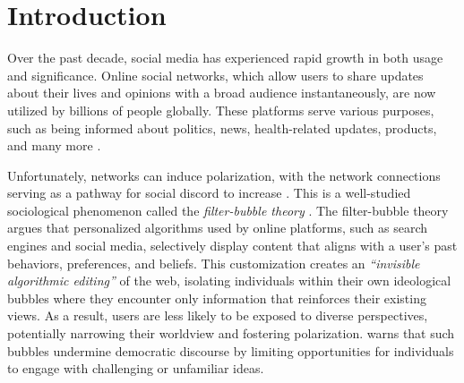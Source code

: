 \section{Introduction}


Over the past decade, social media has experienced rapid growth in both usage and significance. Online social networks, which allow users to share updates about their lives and opinions with a broad audience instantaneously, are now utilized by billions of people globally. These platforms serve various purposes, such as being informed about politics, news, health-related updates, products, and many more \citep{backstrom2012four,young2006diffusion,banerjee2013diffusion,shearer2021news}. 

Unfortunately, networks can induce polarization, with the network connections serving as a pathway for social discord to increase \cite{musco2018minimizing,chen2021adversarial,wang2024relationship,gaitonde2020adversarial}. This is a well-studied sociological phenomenon called the \textit{filter-bubble theory} \citep{pariser2011filter}. The filter-bubble theory argues that personalized algorithms used by online platforms, such as search engines and social media, selectively display content that aligns with a user's past behaviors, preferences, and beliefs. This customization creates an \textit{``invisible algorithmic editing''} of the web, isolating individuals within their own ideological bubbles where they encounter only information that reinforces their existing views. As a result, users are less likely to be exposed to diverse perspectives, potentially narrowing their worldview and fostering polarization. \citet{pariser2011filter} warns that such bubbles undermine democratic discourse by limiting opportunities for individuals to engage with challenging or unfamiliar ideas.

